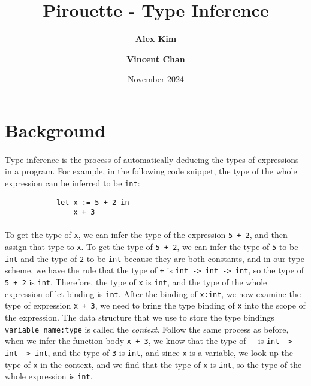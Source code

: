 \documentclass{article}
\title{Pirouette - Type Inference}
\author{\textbf{Alex Kim} \and \textbf{Vincent Chan}}
\date{November 2024}
\begin{document}
\maketitle

\listoffixmes{} %

\section{Background}

    \paragraph{}
        Type inference is the process of automatically deducing the types of expressions in a program.
        For example, in the following code snippet, the type of the whole expression can be inferred to be \texttt{int}:
        \begin{verbatim}
            let x := 5 + 2 in
                x + 3
        \end{verbatim}

    \paragraph{}
        To get the type of \texttt{x}, we can infer the type of the expression \texttt{5 + 2}, and then assign that type to \texttt{x}.
        To get the type of \texttt{5 + 2}, we can infer the type of \texttt{5} to be \texttt{int} and the type of \texttt{2} to be \texttt{int}
        because they are both constants, and in our type scheme, we have the rule that the type of \texttt{+} is \texttt{int -> int -> int}, so the type of \texttt{5 + 2} is \texttt{int}.
        Therefore, the type of \texttt{x} is \texttt{int}, and the type of the whole expression of let binding is \texttt{int}. After the binding of \texttt{x:int}, we now examine the type of expression \texttt{x + 3},
        we need to bring the type binding of \texttt{x} into the scope of the expression. The data structure that we use to store the type bindings \texttt{variable\_name:type} is called the \textit{context}.
        Follow the same process as before, when we infer the function body \texttt{x + 3}, we know that the type of {+} is \texttt{int -> int -> int}, and the type of \texttt{3} is \texttt{int},
        and since \texttt{x} is a variable, we look up the type of \texttt{x} in the context, and we find that the type of \texttt{x} is \texttt{int}, so the type of the whole expression is \texttt{int}.
\end{document}
